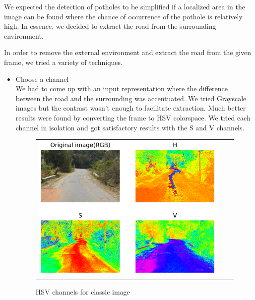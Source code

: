 \documentclass[12pt,a4paper]{article}
\begin{document}
We expected the detection of potholes to be simplified if a localized area in the image can be found where the chance of occurrence of the pothole is relatively high. In essence, we decided to extract the road from the surrounding environment.

In order to remove the external environment and extract the road from the given frame, we tried a variety of techniques. 

\begin{itemize}

\item Choose a channel \\ 

    We had to come up with an input representation where the difference between the road and the surrounding was accentuated. We tried Grayscale images but the contrast wasn't enough to facilitate extraction. Much better results were found by converting the frame to HSV colorspace. We tried each channel in isolation and got satisfactory results with the S and V channels. 

 \begin{figure}[!ht]
\begin{center}

\begin{tabular}{ccc}
\centering
\includegraphics[width = 5in]{images/rgb_hsv_highdpi.png}
\end{tabular}
\caption{HSV channels for classic image}


\end{center}
\end{figure}
\end{itemize}
\end{document}
